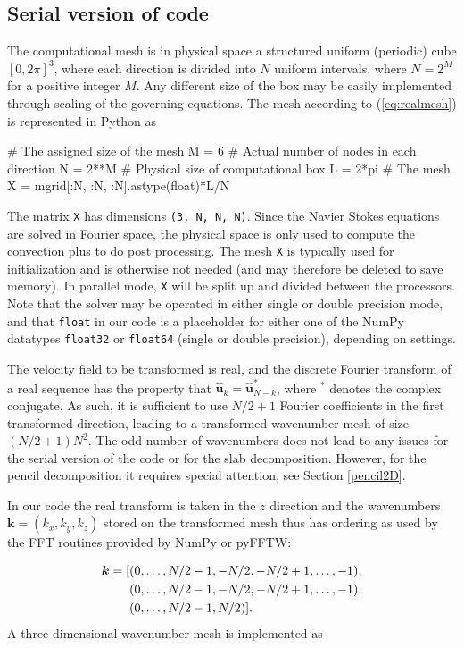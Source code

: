 \documentclass[final,3p,times,twocolumn]{elsarticle}
\newcommand{\inpyth}{\lstinline[style=inlinestyle]} %[]%
\begin{document}
\subsection{Serial version of code}
The computational mesh is in physical space a structured uniform (periodic) 
cube $[0, 2\pi]^3$, where each direction is divided into $N$ uniform intervals, 
where $N=2^M$ for a positive integer $M$. Any different size of the box may be 
easily implemented through scaling of the governing equations. The mesh 
according to (\ref{eq:realmesh}) is represented in Python as

\begin{python}
# The assigned size of the mesh
M = 6       
# Actual number of nodes in each direction
N = 2**M    
# Physical size of computational box
L = 2*pi    
# The mesh
X = mgrid[:N, :N, :N].astype(float)*L/N
\end{python}
The matrix \inpyth{X} has dimensions \inpyth{(3, N, N, N)}. Since the Navier 
Stokes equations are solved in Fourier space, the physical space is only used 
to compute the convection plus to do post processing. The mesh \inpyth{X} is 
typically used for initialization and is otherwise not needed (and may 
therefore be deleted to save memory). In parallel mode, \inpyth{X} will be 
split up and divided between the processors.  Note that the solver may be 
operated in either single or double precision mode, and that \inpyth{float} in 
our code is a placeholder for either one of the NumPy datatypes 
\inpyth{float32} or \inpyth{float64} (single or double precision), depending on 
settings.

The velocity field to be transformed is real, and the discrete Fourier transform of a real sequence has the property that $\hat{\bm{u}}_k = \hat{\bm{u}}_{N-k}^*$, where $^*$ denotes the complex conjugate. As such, it is sufficient to use $N/2+1$ Fourier coefficients in the first transformed direction, leading to a transformed wavenumber mesh of size $(N/2+1)N^2$. The odd number of wavenumbers does not lead to any issues for the serial version of the code or for the slab decomposition. However, for the pencil decomposition it requires special attention, see Section \ref{pencil2D}.

In our code the real transform is taken in the $z$ direction and the 
wavenumbers $\bm{k}=(k_x, k_y, k_z)$ stored on the transformed mesh thus has 
ordering as used by the FFT routines provided by NumPy or pyFFTW:

\begin{align}
  \bm{k} = [&(0, \ldots, N/2-1, -N/2, -N/2+1, \ldots, -1), \notag \\
   &(0, \ldots, N/2-1, -N/2, -N/2+1, \ldots, -1),  \notag \\
  &(0, \ldots, N/2-1, N/2)].
\end{align}
A three-dimensional wavenumber mesh is implemented as
\end{document}
